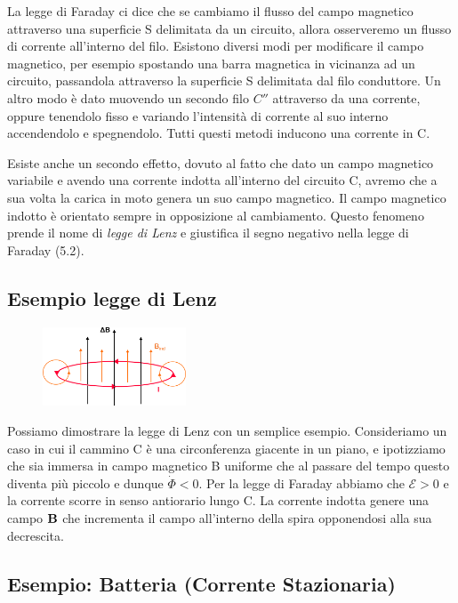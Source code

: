 \noindent La legge di Faraday ci dice che se cambiamo il flusso del campo magnetico attraverso una superficie S delimitata da un circuito, allora osserveremo un flusso di corrente all'interno del filo. Esistono diversi modi per modificare il campo magnetico, per esempio spostando una barra magnetica in vicinanza ad un circuito, passandola attraverso la superficie S delimitata dal filo conduttore. Un altro modo \`e dato muovendo un secondo filo $C''$ attraverso da una corrente, oppure tenendolo fisso e variando l'intensit\`a di corrente al suo interno accendendolo e spegnendolo. Tutti questi metodi inducono una corrente in C.
\newline

Esiste anche un secondo effetto, dovuto al fatto che dato un campo magnetico variabile e avendo una corrente indotta all'interno del circuito C, avremo che a sua volta la carica in moto genera un suo campo magnetico. Il campo magnetico indotto \`e orientato sempre in opposizione al cambiamento. Questo fenomeno prende il nome di \textit{legge di Lenz} e giustifica il segno negativo nella legge di Faraday (5.2). 

\subsection{Esempio legge di Lenz}

\begin{figure} %
    \centering
    \includegraphics[width=0.38\textwidth]{images/lenz_law}
\end{figure}
Possiamo dimostrare la legge di Lenz con un semplice esempio. Consideriamo un caso in cui il cammino C \`e una circonferenza giacente in un piano, e ipotizziamo che sia immersa in campo magnetico B uniforme che al passare del tempo questo diventa pi\`u piccolo e dunque $\dot{\Phi} < 0$. Per la legge di Faraday abbiamo che $\mathcal{E} > 0 $ e la corrente scorre in senso antiorario lungo C. La corrente indotta genere una campo $\bold{B}$ che incrementa il campo all'interno della spira opponendosi alla sua decrescita.

\subsection{Esempio: Batteria (Corrente Stazionaria)}

